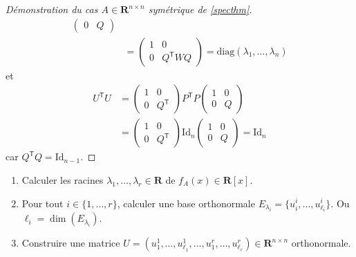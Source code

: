 \begin{proof}[Démonstration du cas $A\in \mathbf{R}^{n\times n}$ symétrique de \ref{specthm}]
\begin{align*}
\begin{pmatrix}
0 & Q
\end{pmatrix} \\
 & =\begin{pmatrix}
1 & 0 \\
0 & Q^{\mathsf{T}}WQ
\end{pmatrix}=\mathrm{diag}(\lambda_{1},\dots,\lambda _{n})
\end{align*}
et
\begin{align*}
U^{\mathsf{T}}U & =\begin{pmatrix}
1 & 0 \\
0 & Q^{\mathsf{T}}
\end{pmatrix}P^{\mathsf{T}}P\begin{pmatrix}1  & 0 \\
0 & Q
\end{pmatrix} \\
 & =\begin{pmatrix}
1 & 0 \\
0 & Q^{\mathsf{T}}
\end{pmatrix} \mathrm{Id}_{n}\begin{pmatrix}
1 & 0 \\
0 & Q
\end{pmatrix}=\mathrm{Id}_{n}
\end{align*}
car $Q^{\mathsf{T}}Q=\mathrm{Id}_{n-1}$.
\end{proof}
\begin{example}
\begin{enumerate}
\item Calculer les racines $\lambda_{1},\dots,\lambda _{r}\in \mathbf{R}$ de $f_{A}(x)\in \mathbf{R}[x]$.
\item Pour tout $i\in \{ 1,\dots,r \}$, calculer une base orthonormale $E_{\lambda _{i}}=\{ u_{i}^{i},\dots,u_{\ell _{i} }^{i} \}$. Ou $\ell_{i}=\dim(E_{\lambda_{i}})$.
\item Construire une matrice $U=(u_{1}^{1},\dots,u_{\ell_{1}}^{1},\dots,u_{1}^{r},\dots,u_{\ell _{r}}^{r})\in \mathbf{R}^{n\times n}$ orthonormale.
\end{enumerate}
\end{example}